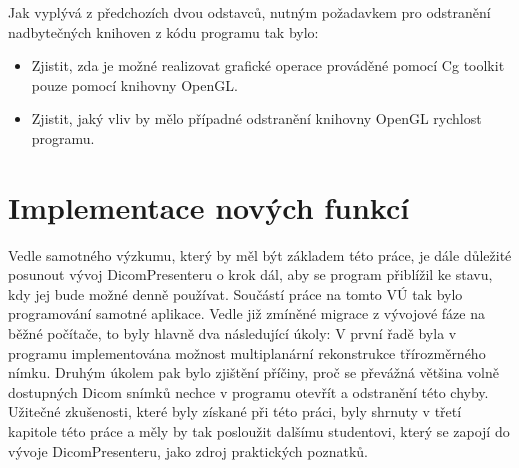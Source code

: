 Jak vyplývá z předchozích dvou odstavců, nutným požadavkem pro odstranění nadbytečných knihoven z kódu programu tak bylo:

\begin{itemize}
\item Zjistit, zda je možné realizovat grafické operace prováděné pomocí Cg toolkit pouze pomocí knihovny OpenGL.
\item Zjistit, jaký vliv by mělo případné odstranění knihovny OpenGL rychlost programu.
\end{itemize}


\section{Implementace nových funkcí}
Vedle samotného výzkumu, který by měl být základem této práce, je dále důležité posunout vývoj DicomPresenteru o krok dál, aby se program přiblížil ke stavu, kdy jej bude možné denně používat. Součástí práce na tomto VÚ tak bylo programování samotné aplikace. Vedle již zmíněné migrace z vývojové fáze na běžné počítače, to byly hlavně dva následující úkoly: V první řadě byla v programu implementována možnost multiplanární rekonstrukce třírozměrného nímku. Druhým úkolem pak bylo zjištění příčiny, proč se převážná většina volně dostupných Dicom snímků nechce v programu otevřít a odstranění této chyby. Užitečné zkušenosti, které byly získané při této práci, byly shrnuty v třetí kapitole této práce a měly by tak posloužit dalšímu studentovi, který se zapojí do vývoje DicomPresenteru, jako zdroj praktických poznatků.
